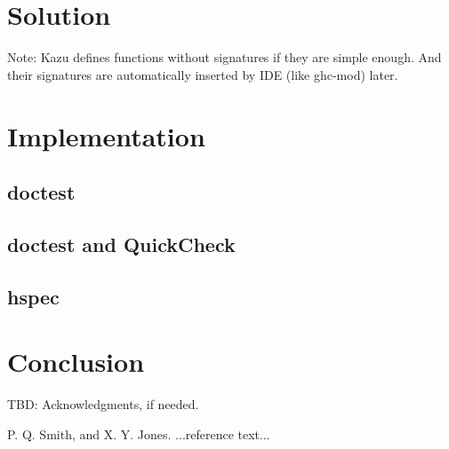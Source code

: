 \documentclass[preprint]{sigplanconf}
\begin{document}
\section{Solution}

Note: Kazu defines functions without signatures if they are simple enough.
And their signatures are automatically inserted by IDE (like ghc-mod) later.

\section{Implementation}

\subsection{doctest}

\subsection{doctest and QuickCheck}

\subsection{hspec}

\section{Conclusion}



\acks

TBD: Acknowledgments, if needed.





\begin{thebibliography}{}
\softraggedright

P. Q. Smith, and X. Y. Jones. ...reference text...

\end{thebibliography}
\end{document}
